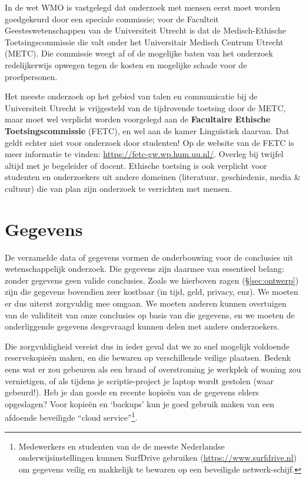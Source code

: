 \documentclass[
]{book}
\begin{document}
In de wet WMO is vastgelegd dat onderzoek met mensen eerst moet worden
goedgekeurd door een speciale commissie; voor de Faculteit
Geesteswetenschappen van de Universiteit Utrecht is dat de
Medisch-Ethische Toetsingscommissie die valt onder het Universitair
Medisch Centrum Utrecht (METC). Die commissie weegt af of de mogelijke
baten van het onderzoek redelijkerwijs opwegen tegen de kosten en
mogelijke schade voor de proefpersonen.

Het meeste onderzoek op het gebied van talen en communicatie bij de
Universiteit Utrecht is vrijgesteld van de tijdrovende toetsing door de
METC, maar moet wel verplicht worden voorgelegd aan de \textbf{Facultaire
Ethische Toetsingscommissie} (FETC), en wel aan de kamer Linguïstiek
daarvan. Dat geldt echter niet voor onderzoek door studenten! Op de website
van de FETC is meer informatie te vinden:
\url{https://fetc-gw.wp.hum.uu.nl/}. Overleg bij twijfel altijd met je begeleider of docent.
Ethische toetsing is ook verplicht voor
studenten en onderzoekers uit andere domeinen (literatuur, geschiedenis,
media \& cultuur) die van plan zijn onderzoek te verrichten met mensen.

\section{Gegevens}\label{gegevens}

De verzamelde data of gegevens vormen de onderbouwing voor de conclusies
uit wetenschappelijk onderzoek. Die gegevens zijn daarmee van essentieel
belang: zonder gegevens geen valide conclusies. Zoals we hierboven zagen
(§\ref{sec:ontwerp})
zijn die gegevens bovendien zeer kostbaar (in tijd, geld, privacy, enz).
We moeten er dus uiterst zorgvuldig mee omgaan. We moeten anderen kunnen
overtuigen van de validiteit van onze conclusies op basis van die
gegevens, en we moeten de onderliggende gegevens desgevraagd kunnen
delen met andere onderzoekers.

Die zorgvuldigheid vereist dus in ieder geval dat we zo snel mogelijk
voldoende reservekopieën maken, en die bewaren op verschillende veilige
plaatsen. Bedenk eens wat er zou gebeuren als een brand of overstroming
je werkplek of woning zou vernietigen, of als tijdens je scriptie-project je laptop wordt gestolen (waar gebeurd!). Heb je dan goede en
recente kopieën van de gegevens elders opgeslagen? Voor kopieën en
`backups' kun je goed gebruik maken van een afdoende beveiligde ``cloud
service''\footnote{Medewerkers en studenten van de de meeste Nederlandse onderwijsinstellingen kunnen SurfDrive gebruiken (\url{https://www.surfdrive.nl}) om gegevens veilig en makkelijk te bewaren op een beveiligde netwerk-schijf.}.
\end{document}
